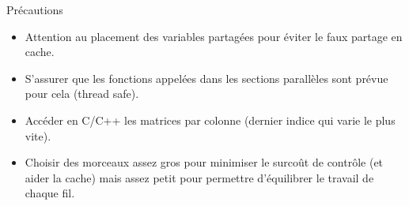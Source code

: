 \documentclass[10pt]{beamer}
\begin{document}
\begin{frame}{Précautions}

  \begin{itemize}
    \item Attention au placement des variables partagées pour éviter le faux partage en cache.

    \item S'assurer que les fonctions appelées dans les sections parallèles sont prévue pour cela (thread safe).

    \item Accéder en C/C++ les matrices par colonne (dernier indice qui varie le plus vite).

    \item Choisir des morceaux assez gros pour minimiser le surcoût de contrôle (et aider la cache) mais assez petit pour permettre d'équilibrer le travail de chaque fil.
  \end{itemize}
\end{frame}
\end{document}

